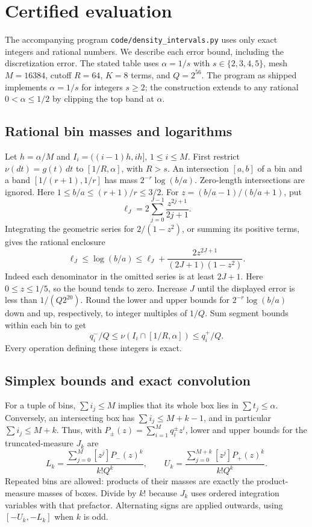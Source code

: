\documentclass[10pt]{article}
\theoremstyle{remark}
\begin{document}
\section{Certified evaluation}\label{sec:numerics}
The accompanying program \texttt{code/density\_intervals.py} uses only
exact integers and rational numbers. We describe each error bound,
including the discretization error. The stated table uses $\alpha=1/s$
with $s\in\{2,3,4,5\}$, mesh $M=16384$, cutoff $R=64$, $K=8$ terms,
and $Q=2^{56}$. The program as shipped implements $\alpha=1/s$ for
integers $s\geq2$; the construction extends to any rational
$0<\alpha\leq1/2$ by clipping the top band at $\alpha$.

\subsection{Rational bin masses and logarithms}\label{subsec:bins}
Let $h=\alpha/M$ and $I_i=((i-1)h,ih]$, $1\leq i\leq M$.
First restrict $\nu(dt)=g(t)\,dt$ to $[1/R,\alpha]$, with $R>s$.
An intersection $[a,b]$ of a bin and a band $[1/(r+1),1/r]$ has mass
$2^{-r}\log(b/a)$. Zero-length intersections are ignored. Here
$1\leq b/a\leq(r+1)/r\leq3/2$. For $z=(b/a-1)/(b/a+1)$, put
\[
 \ell_J=2\sum_{j=0}^{J-1}\frac{z^{2j+1}}{2j+1}.
\]
Integrating the geometric series for $2/(1-z^2)$, or summing its
positive terms, gives the rational enclosure
\begin{equation}\label{eq:loginterval}
 \ell_J\leq\log(b/a)\leq
 \ell_J+\frac{2z^{2J+1}}{(2J+1)(1-z^2)}.
\end{equation}
Indeed each denominator in the omitted series is at least $2J+1$.
Here $0\leq z\leq1/5$, so the bound tends to zero. Increase $J$ until
the displayed error is less than $1/(Q2^{20})$. Round the lower and
upper bounds for $2^{-r}\log(b/a)$ down and up, respectively, to
integer multiples of $1/Q$. Sum segment bounds within each bin to get
\[
 q_i^-/Q\leq\nu(I_i\cap[1/R,\alpha])\leq q_i^+/Q.
\]
Every operation defining these integers is exact.

\subsection{Simplex bounds and exact convolution}\label{subsec:convolution}
For a tuple of bins, $\sum i_j\leq M$ implies that its whole box lies
in $\sum t_j\leq\alpha$. Conversely, an intersecting box has
$\sum i_j\leq M+k-1$, and in particular $\sum i_j\leq M+k$.
Thus, with $P_\pm(z)=\sum_{i=1}^M q_i^\pm z^i$, lower and upper
bounds for the truncated-measure $J_k$ are
\begin{equation}\label{eq:poly}
 L_k=\frac{\sum_{j=0}^M[z^j]P_-(z)^k}{k!Q^k},\qquad
 U_k=\frac{\sum_{j=0}^{M+k}[z^j]P_+(z)^k}{k!Q^k}.
\end{equation}
Repeated bins are allowed: products of their masses are exactly the
product-measure masses of boxes. Divide by $k!$ because $J_k$ uses
ordered integration variables with that prefactor. Alternating signs
are applied outwards, using $[-U_k,-L_k]$ when $k$ is odd.
\end{document}
